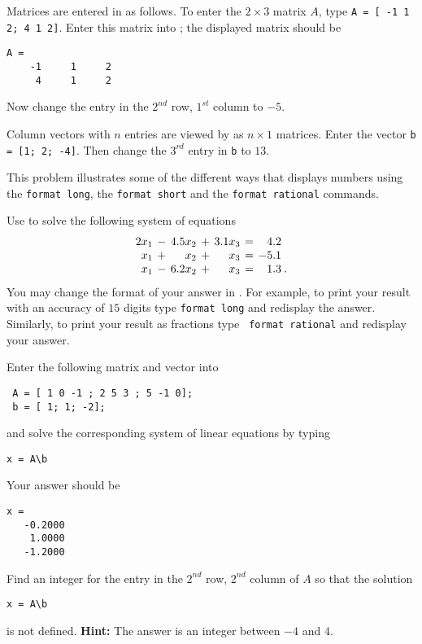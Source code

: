 \documentclass{ximera}
\begin{document}
\begin{exercise} \label{c2.1.2}
Matrices are entered in \Matlab as follows. To enter
the $2\times 3$ matrix $A$, type {\tt A = [ -1 1 2; 4 1 2]}.
Enter this matrix into \Matlabp; the displayed matrix should be
\begin{verbatim}
A =
    -1     1     2
     4     1     2
\end{verbatim}
Now change the entry in the $2^{nd}$ row, $1^{st}$ column to
$-5$.
\end{exercise}

\begin{exercise} \label{c2.1.3}
Column vectors with $n$ entries are viewed by \Matlab as
$n\times 1$ matrices.  Enter the vector {\tt b = [1; 2; -4]}.
Then change the $3^{rd}$ entry in {\tt b} to $13$.
\end{exercise}


\begin{exercise} \label{c2.1.4}
This problem illustrates some of the different ways that \Matlab
displays numbers using the {\tt format long}, the {\tt format short} and
the {\tt format rational} commands.

Use \Matlab to solve the following system of equations
\[
\arraycolsep 2pt
\begin{array}{rcrcrcrl}
 2x_1 & - & 4.5x_2 & + & 3.1x_3 & = &   4.2  & \\
  x_1 & + &  x_2 & + &  x_3 & = &  -5.1  & \\
  x_1 & - & 6.2x_2 & + &  x_3 & = &  1.3  & \! .
\end{array}
\]
You may change the format of your answer in \Matlabp.  For
example, to print your result with an accuracy of $15$ digits
type {\tt format long}  and redisplay the
answer.  Similarly, to print your result as fractions type {\tt
format rational}  and redisplay your
answer.
\end{exercise}

\begin{exercise} \label{c2.1.5}
Enter the following matrix and vector into \Matlab
\begin{verbatim}
 A = [ 1 0 -1 ; 2 5 3 ; 5 -1 0];
 b = [ 1; 1; -2];
\end{verbatim}
and solve the corresponding system of linear equations by typing
\begin{verbatim}
x = A\b
\end{verbatim}
Your answer should be
\begin{verbatim}
x =
   -0.2000
    1.0000
   -1.2000
\end{verbatim}
Find an integer for the entry in the $2^{nd}$ row, $2^{nd}$ column
of $A$ so that the solution
\begin{verbatim}
x = A\b
\end{verbatim}
is not defined.  {\bf Hint:} The answer is an integer between
$-4$ and $4$.
\end{exercise}
\end{document}
